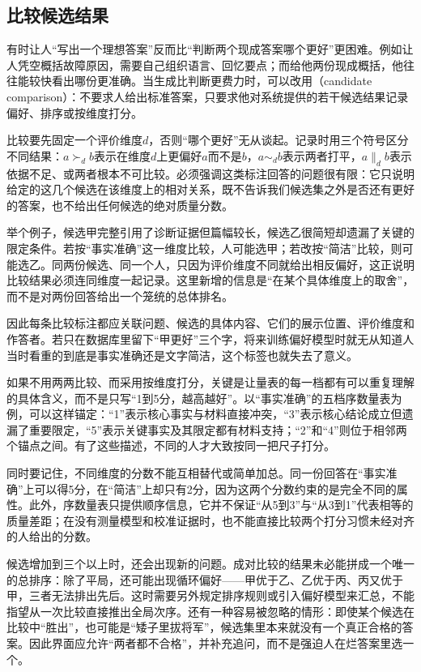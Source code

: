 \subsection{比较候选结果}
\label{sec:knowledge-acquisition-human-comparison}

有时让人“写出一个理想答案”反而比“判断两个现成答案哪个更好”更困难。例如让人凭空概括故障原因，需要自己组织语言、回忆要点；而给他两份现成概括，他往往能较快看出哪份更准确。当生成比判断更费力时，可以改用（candidate comparison）：不要求人给出标准答案，只要求他对系统提供的若干候选结果记录偏好、排序或按维度打分。

比较要先固定一个评价维度$d$，否则“哪个更好”无从谈起。记录时用三个符号区分不同结果：$a\succ_d b$表示在维度$d$上更偏好$a$而不是$b$，$a\sim_d b$表示两者打平，$a\parallel_d b$表示依据不足、或两者根本不可比较。必须强调这类标注回答的问题很有限：它只说明给定的这几个候选在该维度上的相对关系，既不告诉我们候选集之外是否还有更好的答案，也不给出任何候选的绝对质量分数。

举个例子，候选甲完整引用了诊断证据但篇幅较长，候选乙很简短却遗漏了关键的限定条件。若按“事实准确”这一维度比较，人可能选甲；若改按“简洁”比较，则可能选乙。同两份候选、同一个人，只因为评价维度不同就给出相反偏好，这正说明比较结果必须连同维度一起记录。这里新增的信息是“在某个具体维度上的取舍”，而不是对两份回答给出一个笼统的总体排名。

因此每条比较标注都应关联问题、候选的具体内容、它们的展示位置、评价维度和作答者。若只在数据库里留下“甲更好”三个字，将来训练偏好模型时就无从知道人当时看重的到底是事实准确还是文字简洁，这个标签也就失去了意义。

如果不用两两比较、而采用按维度打分，关键是让量表的每一档都有可以重复理解的具体含义，而不是只写“1到5分，越高越好”。以“事实准确”的五档序数量表为例，可以这样锚定：“1”表示核心事实与材料直接冲突，“3”表示核心结论成立但遗漏了重要限定，“5”表示关键事实及其限定都有材料支持；“2”和“4”则位于相邻两个锚点之间。有了这些描述，不同的人才大致按同一把尺子打分。

同时要记住，不同维度的分数不能互相替代或简单加总。同一份回答在“事实准确”上可以得5分，在“简洁”上却只有2分，因为这两个分数约束的是完全不同的属性。此外，序数量表只提供顺序信息，它并不保证“从5到3”与“从3到1”代表相等的质量差距；在没有测量模型和校准证据时，也不能直接比较两个打分习惯未经对齐的人给出的分数。

候选增加到三个以上时，还会出现新的问题。成对比较的结果未必能拼成一个唯一的总排序：除了平局，还可能出现循环偏好——甲优于乙、乙优于丙、丙又优于甲，三者无法排出先后。这时需要另外规定排序规则或引入偏好模型来汇总，不能指望从一次比较直接推出全局次序。还有一种容易被忽略的情形：即使某个候选在比较中“胜出”，也可能是“矮子里拔将军”，候选集里本来就没有一个真正合格的答案。因此界面应允许“两者都不合格”，并补充追问，而不是强迫人在烂答案里选一个。


